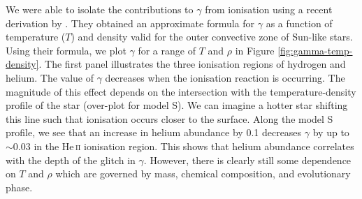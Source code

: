 We were able to isolate the contributions to \(\gamma\) from ionisation using a recent derivation by \citet{Houdayer.Reese.ea2021}. They obtained an approximate formula for \(\gamma\) as a function of temperature (\(T\)) and density valid for the outer convective zone of Sun-like stars. Using their formula, we plot \(\gamma\) for a range of \(T\) and \(\rho\) in Figure \ref{fig:gamma-temp-density}. The first panel illustrates the three ionisation regions of hydrogen and helium. The value of \(\gamma\) decreases when the ionisation reaction is occurring. The magnitude of this effect depends on the intersection with the temperature-density profile of the star (over-plot for model S). We can imagine a hotter star shifting this line such that ionisation occurs closer to the surface. Along the model S profile, we see that an increase in helium abundance by 0.1 decreases \(\gamma\) by up to \(\sim 0.03\) in the He\,\textsc{ii} ionisation region. This shows that helium abundance correlates with the depth of the glitch in \(\gamma\). However, there is clearly still some dependence on \(T\) and \(\rho\) which are governed by mass, chemical composition, and evolutionary phase.

